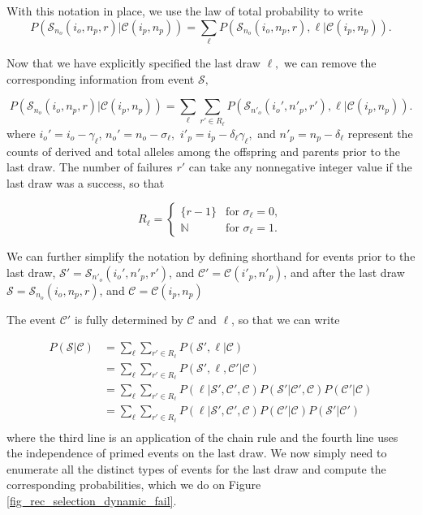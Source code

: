 \documentclass[9pt,twocolumn,twoside,lineno]{gsajnl}
\newcommand{\CC}{\mathcal{C}}
\newcommand{\ms}{\mathcal{S}}
\begin{document}
With this notation in place, we use the law of total probability to write
 \begin{equation}
  P( \ms_{n_o}(i_o, n_p, r) | \CC{(i_p,n_p)} ) = \sum_\ell P( \ms_{n_o}(i_o, n_p, r),\ell | \CC(i_p,n_p) ) .
 \end{equation}

Now that we have explicitly specified the last draw $\ell,$ we can remove the corresponding
information from event $\ms,$

\begin{equation}
  P(\ms_{n_o}(i_o, n_p, r) | \CC{(i_p,n_p)} ) = \sum_\ell \sum_{r' \in R_\ell} P(\ms_{n'_o}(i_o',
  n'_p, r'),\ell | \CC{(i_p,n_p)} ) .
\end{equation}
where $i_o' = i_o-\gamma_\ell$,  $n_o' = n_o-\sigma_\ell,$ $i'_p= i_p - \delta_\ell \gamma_\ell,$  and $n'_p  = n_p - \delta_\ell$ represent the
counts of derived and total alleles among the offspring and parents prior to the last draw.
 The number of failures $r'$ can take any nonnegative integer value if the last draw was a success,
so that

\begin{equation}
  R_\ell = \begin{cases}
    \{r-1\}    & \text{for } \sigma_\ell = 0, \\
    \mathbb{N} & \text{for } \sigma_\ell = 1.
  \end{cases}
\end{equation}

We can further simplify the notation by defining shorthand for events prior to the last draw,
 $\ms' = \ms_{n'_o}(i_o', n'_p, r')$, and $\CC' = \CC{(i'_p,n'_p)}$, and after the
last draw $\ms = \ms_{n_o}(i_o, n_p, r)$, and $\CC = \CC{(i_p,n_p)}$

The event  $\CC'$ is fully determined by  $\CC$ and $\ell$, so that we can write

\begin{equation}
  \begin{split}
    P(\ms| \CC) &= \sum_\ell \sum_{r' \in R_\ell}
    P(\ms',\ell | \CC) \\
    &=\sum_\ell \sum_{r' \in R_\ell}P( \ms',\ell, \CC' |\CC) \\
    &=\sum_\ell \sum_{r' \in R_\ell}P(\ell | \ms', \CC', \CC ) P( \ms'| \CC', \CC)  P(\CC' |\CC) \\
    &=\sum_\ell \sum_{r' \in R_\ell}P(\ell | \ms', \CC', \CC )  P(\CC' |\CC)  P( \ms'| \CC') \\
  \end{split}
\end{equation}
where the third line is an application of the chain rule and the fourth line uses the independence
of primed events on the last draw.  We now simply need to enumerate all the distinct types of
events for the last draw and compute the corresponding probabilities, which we do on Figure
\ref{fig_rec_selection_dynamic_fail}.
\end{document}
